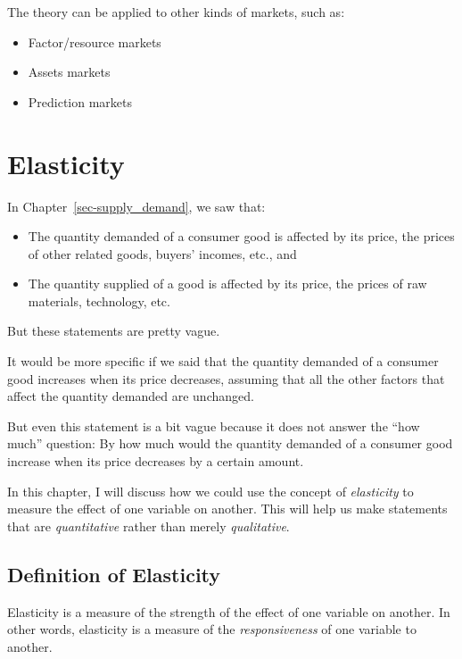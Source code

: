 \documentclass[
  letterpaper,
]{book}
\providecommand{\tightlist}{%
  \setlength{\itemsep}{0pt}\setlength{\parskip}{0pt}}\usepackage{longtable,booktabs,array}
\begin{document}
The theory can be applied to other kinds of markets, such as:

\begin{itemize}
\tightlist
\item
  Factor/resource markets
\item
  Assets markets
\item
  Prediction markets
\end{itemize}


\chapter{Elasticity}\label{elasticity}

In Chapter~\ref{sec-supply_demand}, we saw that:

\begin{itemize}
\tightlist
\item
  The quantity demanded of a consumer good is affected by its price, the
  prices of other related goods, buyers' incomes, etc., and
\item
  The quantity supplied of a good is affected by its price, the prices
  of raw materials, technology, etc.
\end{itemize}

But these statements are pretty vague.

It would be more specific if we said that the quantity demanded of a
consumer good increases when its price decreases, assuming that all the
other factors that affect the quantity demanded are unchanged.

But even this statement is a bit vague because it does not answer the
``how much'' question: By how much would the quantity demanded of a
consumer good increase when its price decreases by a certain amount.

In this chapter, I will discuss how we could use the concept of
\emph{elasticity} to measure the effect of one variable on another. This
will help us make statements that are \emph{quantitative} rather than
merely \emph{qualitative}.

\section{Definition of Elasticity}\label{definition-of-elasticity}

Elasticity is a measure of the strength of the effect of one variable on
another. In other words, elasticity is a measure of the
\emph{responsiveness} of one variable to another.
\end{document}
